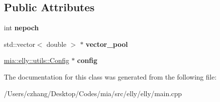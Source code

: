 \subsection*{Public Attributes}
\begin{DoxyCompactItemize}
\item 
\hypertarget{classmia_1_1elly_1_1_elly_a10d33c83a306c678d2f97afec4a7565e}{int {\bfseries nepoch}}\label{classmia_1_1elly_1_1_elly_a10d33c83a306c678d2f97afec4a7565e}

\item 
\hypertarget{classmia_1_1elly_1_1_elly_a70d6c80bb20a710991443696e53b6570}{std\-::vector$<$ double $>$ $\ast$ {\bfseries vector\-\_\-pool}}\label{classmia_1_1elly_1_1_elly_a70d6c80bb20a710991443696e53b6570}

\item 
\hypertarget{classmia_1_1elly_1_1_elly_a47a74ba9f8cd11ef0cf7e0aba883e6d2}{\hyperlink{classmia_1_1elly_1_1utils_1_1_config}{mia\-::elly\-::utils\-::\-Config} $\ast$ {\bfseries config}}\label{classmia_1_1elly_1_1_elly_a47a74ba9f8cd11ef0cf7e0aba883e6d2}

\end{DoxyCompactItemize}


The documentation for this class was generated from the following file\-:\begin{DoxyCompactItemize}
\item 
/\-Users/czhang/\-Desktop/\-Codes/mia/src/elly/elly/main.\-cpp\end{DoxyCompactItemize}
